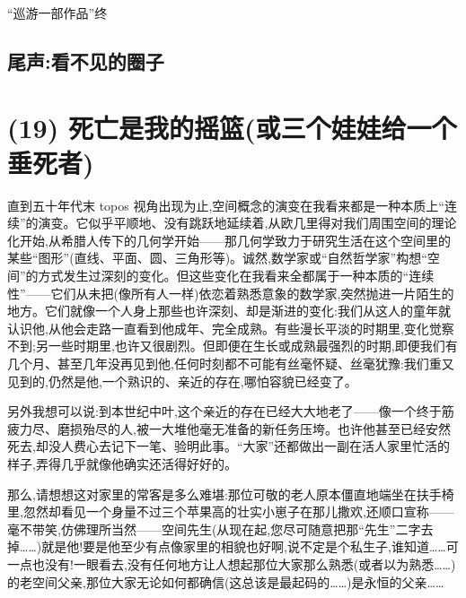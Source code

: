 \begin{center}
“巡游一部作品”终
\end{center}

\subsection*{尾声:看不见的圈子}

\section{(19) 死亡是我的摇篮(或三个娃娃给一个垂死者)}

直到五十年代末 topos 视角出现为止,空间概念的演变在我看来都是一种本质上“连续”的演变。它似乎平顺地、没有跳跃地延续着,从欧几里得对我们周围空间的理论化开始,从希腊人传下的几何学开始——那几何学致力于研究生活在这个空间里的某些“图形”(直线、平面、圆、三角形等)。诚然,数学家或“自然哲学家”构想“空间”的方式发生过深刻的变化。但这些变化在我看来全都属于一种本质的“连续性”——它们从未把(像所有人一样)依恋着熟悉意象的数学家,突然抛进一片陌生的地方。它们就像一个人身上那些也许深刻、却是渐进的变化:我们从这人的童年就认识他,从他会走路一直看到他成年、完全成熟。有些漫长平淡的时期里,变化觉察不到;另一些时期里,也许又很剧烈。但即便在生长或成熟最强烈的时期,即便我们有几个月、甚至几年没再见到他,任何时刻都不可能有丝毫怀疑、丝毫犹豫:我们重又见到的,仍然是他,一个熟识的、亲近的存在,哪怕容貌已经变了。

另外我想可以说:到本世纪中叶,这个亲近的存在已经大大地老了——像一个终于筋疲力尽、磨损殆尽的人,被一大堆他毫无准备的新任务压垮。也许他甚至已经安然死去,却没人费心去记下一笔、验明此事。“大家”还都做出一副在活人家里忙活的样子,弄得几乎就像他确实还活得好好的。

那么,请想想这对家里的常客是多么难堪:那位可敬的老人原本僵直地端坐在扶手椅里,忽然却看见一个身量不过三个苹果高的壮实小崽子在那儿撒欢,还顺口宣称——毫不带笑,仿佛理所当然——空间先生(从现在起,您尽可随意把那“先生”二字去掉……)就是他!要是他至少有点像家里的相貌也好啊,说不定是个私生子,谁知道……可一点也没有!一眼看去,没有任何地方让人想起那位大家那么熟悉(或者以为熟悉……)的老空间父亲,那位大家无论如何都确信(这总该是最起码的……)是永恒的父亲……

